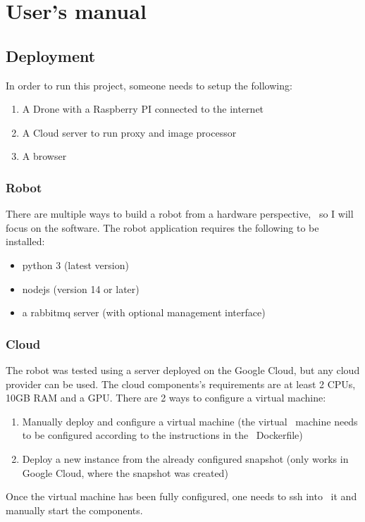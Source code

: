 

\chapter{User's manual}
\label{ch:user-manual}

\section{Deployment}
\label{sec:user-manual-deployment}

In order to run this project, someone needs to setup the following:
\begin{enumerate}
    \item A Drone with a Raspberry PI connected to the internet
    \item A Cloud server to run proxy and image processor
    \item A browser
\end{enumerate}

\subsection{Robot}
\label{subsec:user-manual-robot}
There are multiple ways to build a robot from a hardware perspective, \
so I will focus on the software.
The robot application requires the following to be installed:
\begin{itemize}
    \item python 3 (latest version)
    \item nodejs (version 14 or later)
    \item a rabbitmq server (with optional management interface)
\end{itemize}


\subsection{Cloud}
\label{subsec:user-manual-cloud}
The robot was tested using a server deployed on the Google Cloud,
but any cloud provider can be used.
The cloud components's requirements are at least 2 CPUs, 10GB RAM and
a GPU.
There are 2 ways to configure a virtual machine:
\begin{enumerate}
    \item Manually deploy and configure a virtual machine (the virtual \
        machine needs to be configured according to the instructions in the \
        Dockerfile)
    \item Deploy a new instance from the already configured snapshot
        (only works in Google Cloud, where the snapshot was created)
\end{enumerate}
Once the virtual machine has been fully configured, one needs to ssh into \
it and manually start the components.


